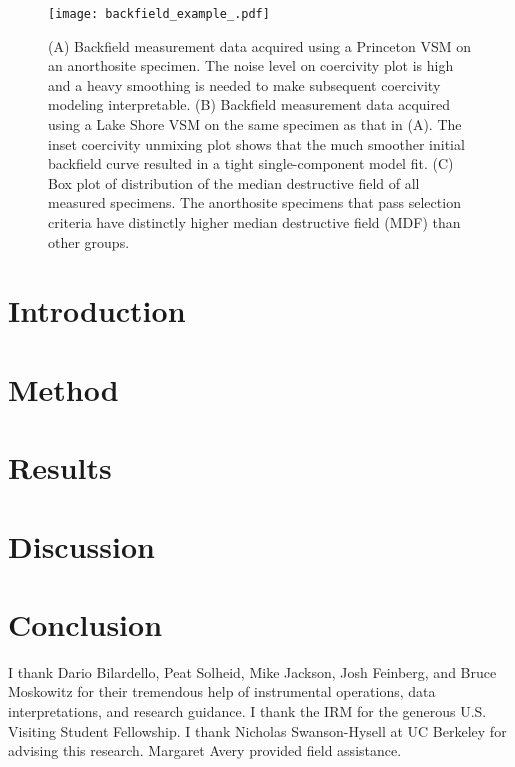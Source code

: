 \documentclass[draft]{agujournal2019}
\begin{document}
\begin{figure}
\begin{center}
	\noindent\texttt{[image: backfield\_example\_.pdf]}
\end{center}
\caption{\small{(A) Backfield measurement data acquired using a Princeton VSM on an anorthosite specimen. The noise level on coercivity plot is high and a heavy smoothing is needed to make subsequent coercivity modeling interpretable. (B) Backfield measurement data acquired using a Lake Shore VSM on the same specimen as that in (A). The inset coercivity unmixing plot shows that the much smoother initial backfield curve resulted in a tight single-component model fit. (C) Box plot of distribution of the median destructive field of all measured specimens. The anorthosite specimens that pass selection criteria have distinctly higher median destructive field (MDF) than other groups.}}
\label{fig:backfield}
\end{figure}








\section*{Introduction}

\section*{Method}

\section*{Results}

\section*{Discussion}

\section*{Conclusion}

\acknowledgments
I thank Dario Bilardello, Peat Solheid, Mike Jackson, Josh Feinberg, and Bruce Moskowitz for their tremendous help of instrumental operations, data interpretations, and research guidance. I thank the IRM for the generous U.S. Visiting Student Fellowship. I thank Nicholas Swanson-Hysell at UC Berkeley for advising this research. Margaret Avery provided field assistance.



\end{document}
